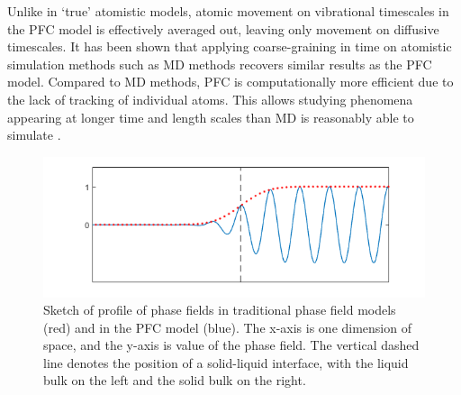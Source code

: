 Unlike in `true' atomistic models, atomic movement on vibrational timescales in the PFC model is effectively averaged out, leaving only movement on diffusive timescales. It has been shown \cite{grant08} that applying coarse-graining in time on atomistic simulation methods such as MD methods recovers similar results as the PFC model. Compared to MD methods, PFC is computationally more efficient due to the lack of tracking of individual atoms. This allows studying phenomena appearing at longer time and length scales than MD is reasonably able to simulate \cite{dantzig12}.

\begin{figure}[h]
\centering
\includegraphics[width=1\textwidth]{fig_pfc/phasefield_profile.png}
\caption{Sketch of profile of phase fields in traditional phase field models (red) and in the PFC model (blue). The x-axis is one dimension of space, and the y-axis is value of the phase field. The vertical dashed line denotes the position of a solid-liquid interface, with the liquid bulk on the left and the solid bulk on the right.}\label{fig:phasefield_profile}
\end{figure}

